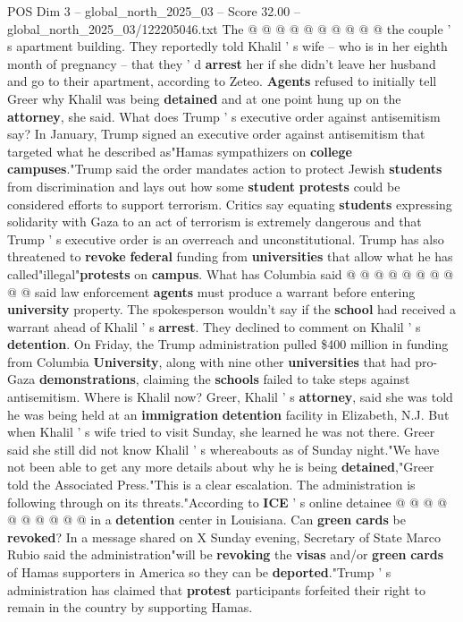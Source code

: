 \begin{textsample}{POS Dim 3 – global\_north\_2025\_03 – Score 32.00 – global\_north\_2025\_03/122205046.txt}
The @ @ @ @ @ @ @ @ @ @ the couple ' s apartment building.
They reportedly told Khalil ' s wife -- who is in her eighth month of pregnancy -- that they ' d \textbf{arrest} her if she didn't leave her husband and go to their apartment, according to Zeteo. \textbf{Agents} refused to initially tell Greer why Khalil was being \textbf{detained} and at one point hung up on the \textbf{attorney}, she said.
What does Trump ' s executive order against antisemitism say?
In January, Trump signed an executive order against antisemitism that targeted what he described as"Hamas sympathizers on \textbf{college} \textbf{campuses}."Trump said the order mandates action to protect Jewish \textbf{students} from discrimination and lays out how some \textbf{student} \textbf{protests} could be considered efforts to support terrorism.
Critics say equating \textbf{students} expressing solidarity with Gaza to an act of terrorism is extremely dangerous and that Trump ' s executive order is an overreach and unconstitutional.
Trump has also threatened to \textbf{revoke} \textbf{federal} funding from \textbf{universities} that allow what he has called"illegal"\textbf{protests} on \textbf{campus}.
What has Columbia said @ @ @ @ @ @ @ @ @ @ said law enforcement \textbf{agents} must produce a warrant before entering \textbf{university} property.
The spokesperson wouldn't say if the \textbf{school} had received a warrant ahead of Khalil ' s \textbf{arrest}.
They declined to comment on Khalil ' s \textbf{detention}.
On Friday, the Trump administration pulled \$400 million in funding from Columbia \textbf{University}, along with nine other \textbf{universities} that had pro-Gaza \textbf{demonstrations}, claiming the \textbf{schools} failed to take steps against antisemitism.
Where is Khalil now?
Greer, Khalil ' s \textbf{attorney}, said she was told he was being held at an \textbf{immigration} \textbf{detention} facility in Elizabeth, N.J.
But when Khalil ' s wife tried to visit Sunday, she learned he was not there.
Greer said she still did not know Khalil ' s whereabouts as of Sunday night."We have not been able to get any more details about why he is being \textbf{detained},"Greer told the Associated Press."This is a clear escalation.
The administration is following through on its threats."According to \textbf{ICE} ' s online detainee @ @ @ @ @ @ @ @ @ @ in a \textbf{detention} center in Louisiana.
Can \textbf{green} \textbf{cards} be \textbf{revoked}?
In a message shared on X Sunday evening, Secretary of State Marco Rubio said the administration"will be \textbf{revoking} the \textbf{visas} and/or \textbf{green} \textbf{cards} of Hamas supporters in America so they can be \textbf{deported}."Trump ' s administration has claimed that \textbf{protest} participants forfeited their right to remain in the country by supporting Hamas.

\end{textsample}
